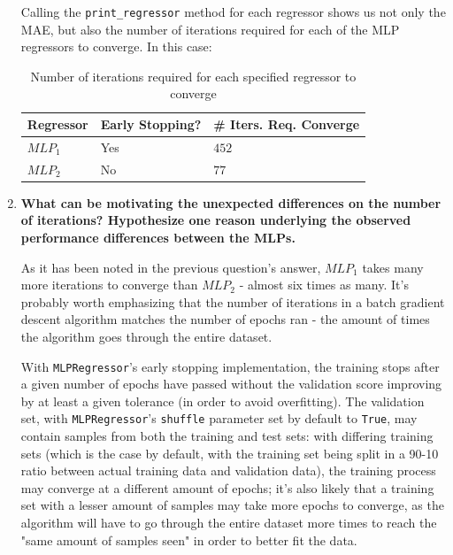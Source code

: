 \documentclass[12pt]{article}
\begin{document}
\begin{enumerate}[leftmargin=\labelsep,resume]
        Calling the \texttt{print\_regressor} method for each regressor shows us
        not only the MAE, but also the number of iterations required for each of
        the MLP regressors to converge. In this case:

        \begin{table}[H]
          \centering
          \begin{tabular}{l|l|l}
            \textbf{Regressor} & \textbf{Early Stopping?} & \textbf{\# Iters. Req. Converge} \\ \hline
            $MLP_1$            & Yes                      & $452$                            \\
            $MLP_2$            & No                       & $77$
          \end{tabular}
          \caption{Number of iterations required for each specified regressor to converge}
          \label{tab:iterations-required-converge}
        \end{table}

        \pagebreak

  \item \textbf{What can be motivating the unexpected differences on the number of iterations?
          Hypothesize one reason underlying the observed performance differences between the MLPs.}

        As it has been noted in the previous question's answer, $MLP_1$ takes many more
        iterations to converge than $MLP_2$ - almost six times as many. It's probably
        worth emphasizing that the number of iterations in a batch gradient descent
        algorithm matches the number of epochs ran - the amount of times the algorithm goes
        through the entire dataset.

        With \texttt{MLPRegressor}'s early stopping implementation, the training stops
        after a given number of epochs have passed without the validation score
        improving by at least a given tolerance (in order to avoid overfitting).
        The validation set, with \texttt{MLPRegressor}'s \texttt{shuffle} parameter
        set by default to \texttt{True}, may contain samples from both the training and test sets:
        with differing training sets (which is the case by default, with the training
        set being split in a 90-10 ratio between actual training data and validation data),
        the training process may converge at a different amount of epochs; it's
        also likely that a training set with a lesser amount of samples may
        take more epochs to converge, as the algorithm will have to go through
        the entire dataset more times to reach the "same amount of samples seen"
        in order to better fit the data.


\end{enumerate}
\end{document}
